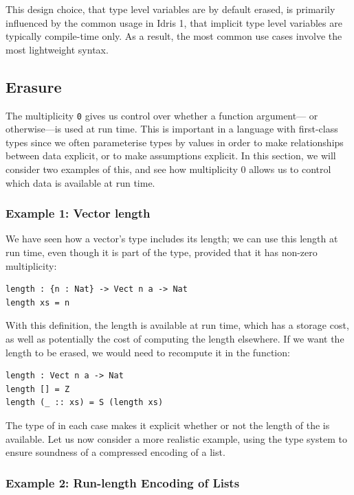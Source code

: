 This design choice, that type level variables are by default
erased, is primarily influenced by the common usage in Idris 1, that
implicit type level variables are typically compile-time only.
As a result, the most common use cases involve the most lightweight syntax.

\subsection{Erasure}

\label{sec:erasure}

The multiplicity \texttt{0} gives us control over whether a function
argument--- or otherwise---is used at run time. This is important in
a language with first-class types since we often parameterise types by values
in order to make relationships between data explicit, or to make assumptions
explicit. In this section, we will consider two examples of this, and see
how multiplicity 0 allows us to control which data is available at run time.

\subsubsection{Example 1: Vector length}

We have seen how a vector's type includes its length;
we can use this length at run time, even though it is
part of the type, provided that it has non-zero multiplicity:

\begin{lstlisting}
length : {n : Nat} -> Vect n a -> Nat
length xs = n
\end{lstlisting}

With this definition, the length  is available at run time, which has
a storage cost, as well as potentially the cost of computing the length
elsewhere. If we want the length to be erased, we would need to recompute it
in the  function:

\begin{lstlisting}
length : Vect n a -> Nat
length [] = Z
length (_ :: xs) = S (length xs)
\end{lstlisting}

The type of  in each case makes it explicit whether or not the
length of the  is available. Let us now consider a more realistic
example, using the type system to ensure soundness of a compressed encoding
of a list.

\subsubsection{Example 2: Run-length Encoding of Lists}

